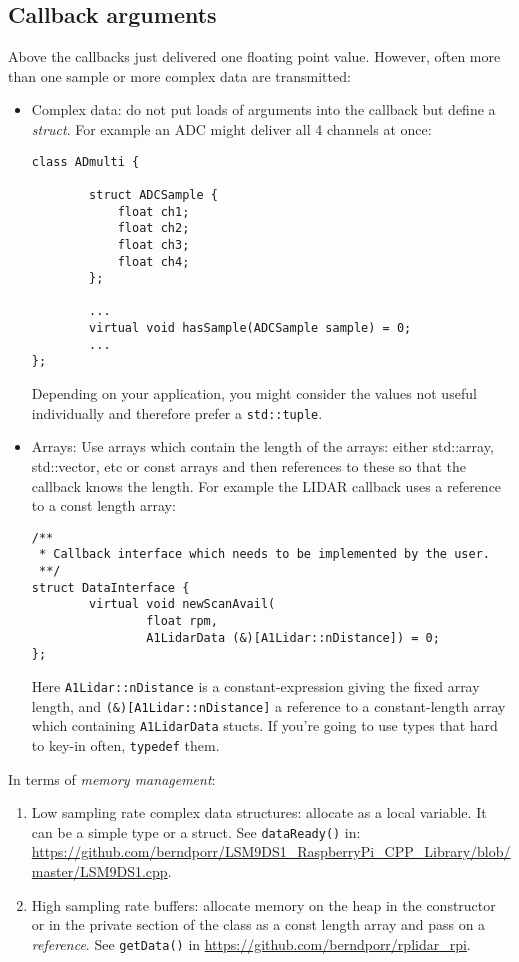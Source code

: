 \documentclass[12pt]{report}
\begin{document}
\subsection{Callback arguments}
Above the callbacks just delivered one floating point value. However,
often more than one sample or more complex data are transmitted:
\begin{itemize}
\item Complex data: do not put loads of arguments into the
  callback but define a \textsl{struct}. For example an ADC might
  deliver all 4 channels at once:
\begin{verbatim}
class ADmulti {

        struct ADCSample {
            float ch1;
            float ch2;
            float ch3;
            float ch4;
        };

        ...
        virtual void hasSample(ADCSample sample) = 0;
        ...
};
\end{verbatim}
Depending on your application,
you might consider the values not useful individually and therefore prefer
a \texttt{std::tuple}.
\item Arrays: Use arrays which contain the length of the arrays:
  either std::array, std::vector, etc or const arrays and then
  references to these so that the callback knows the length.
  For example the LIDAR callback uses a reference to a const length
  array:
\begin{verbatim}
/**
 * Callback interface which needs to be implemented by the user.
 **/
struct DataInterface {
        virtual void newScanAvail(
                float rpm, 
                A1LidarData (&)[A1Lidar::nDistance]) = 0;
};
\end{verbatim}
Here \texttt{A1Lidar::nDistance} is a constant-expression giving the fixed array length,
and \texttt{(\&)[A1Lidar::nDistance]} a reference to a constant-length array which
containing \texttt{A1LidarData} stucts. If you're going to use types that hard to key-in
often, \texttt{typedef} them.
\end{itemize}
In terms of \textsl{memory management}:
\begin{enumerate}
\item Low sampling rate complex data structures: allocate as a local variable. It can be a simple type
  or a struct. See \texttt{dataReady()} in: \url{https://github.com/berndporr/LSM9DS1_RaspberryPi_CPP_Library/blob/master/LSM9DS1.cpp}.
\item High sampling rate buffers: allocate memory on the heap in the
  constructor or in the private section of the class as a const length
  array and pass on a \textsl{reference}. See \texttt{getData()} in
  \url{https://github.com/berndporr/rplidar_rpi}.
\end{enumerate}
\end{document}
